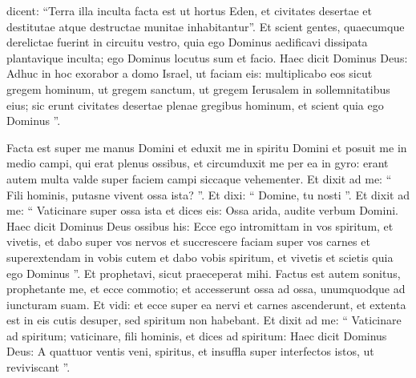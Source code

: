 \begin{biblechapter}
\begin{biblechapter}
\begin{biblechapter}
\begin{biblechapter}
\begin{biblechapter}
\begin{biblechapter}
\begin{biblechapter}
\begin{biblechapter}
\begin{biblechapter}
\begin{biblechapter}
\begin{biblechapter}
\begin{biblechapter}
\begin{biblechapter}
\begin{biblechapter}
\begin{biblechapter}
\begin{biblechapter}
\begin{biblechapter}
\begin{biblechapter}
\begin{biblechapter}
\begin{biblechapter}
\begin{biblechapter}
\begin{biblechapter}
\begin{biblechapter}
\begin{biblechapter}
\begin{biblechapter}
\begin{biblechapter}
\begin{biblechapter}
\begin{biblechapter}
\begin{biblechapter}
\begin{biblechapter}
\begin{biblechapter}
\begin{biblechapter}
\begin{biblechapter}
\begin{biblechapter}
\begin{biblechapter}
\begin{biblechapter}
 \verse dicent: “Terra illa inculta facta est ut hortus Eden, et civitates desertae et destitutae atque destructae munitae inhabitantur”. 
\verse Et scient gentes, quaecumque derelictae fuerint in circuitu vestro, quia ego Dominus aedificavi dissipata plantavique inculta; ego Dominus locutus sum et facio.
 \verse Haec dicit Dominus Deus: Adhuc in hoc exorabor a domo Israel, ut faciam eis: multiplicabo eos sicut gregem hominum, 
\verse ut gregem sanctum, ut gregem Ierusalem in sollemnitatibus eius; sic erunt civitates desertae plenae gregibus hominum, et scient quia ego Dominus ”.
 
\begin{biblechapter}
\verse Facta est super me manus Domini et eduxit me in spiritu Domini et posuit me in medio campi, qui erat plenus ossibus, 
\verse et circumduxit me per ea in gyro: erant autem multa valde super faciem campi siccaque vehementer. 
\verse Et dixit ad me: “ Fili hominis, putasne vivent ossa ista? ”. Et dixi: “ Domine, tu nosti ”. 
\verse Et dixit ad me: “ Vaticinare super ossa ista et dices eis: Ossa arida, audite verbum Domini. 
\verse Haec dicit Dominus Deus ossibus his: Ecce ego intromittam in vos spiritum, et vivetis, 
\verse et dabo super vos nervos et succrescere faciam super vos carnes et superextendam in vobis cutem et dabo vobis spiritum, et vivetis et scietis quia ego Dominus ”. 
\verse Et prophetavi, sicut praeceperat mihi. Factus est autem sonitus, prophetante me, et ecce commotio; et accesserunt ossa ad ossa, unumquodque ad iuncturam suam. 
\verse Et vidi: et ecce super ea nervi et carnes ascenderunt, et extenta est in eis cutis desuper, sed spiritum non habebant. 
\verse Et dixit ad me: “ Vaticinare ad spiritum; vaticinare, fili hominis, et dices ad spiritum: Haec dicit Dominus Deus: A quattuor ventis veni, spiritus, et insuffla super interfectos istos, ut reviviscant ”. 

\end{biblechapter}
\end{biblechapter}
\end{biblechapter}
\end{biblechapter}
\end{biblechapter}
\end{biblechapter}
\end{biblechapter}
\end{biblechapter}
\end{biblechapter}
\end{biblechapter}
\end{biblechapter}
\end{biblechapter}
\end{biblechapter}
\end{biblechapter}
\end{biblechapter}
\end{biblechapter}
\end{biblechapter}
\end{biblechapter}
\end{biblechapter}
\end{biblechapter}
\end{biblechapter}
\end{biblechapter}
\end{biblechapter}
\end{biblechapter}
\end{biblechapter}
\end{biblechapter}
\end{biblechapter}
\end{biblechapter}
\end{biblechapter}
\end{biblechapter}
\end{biblechapter}
\end{biblechapter}
\end{biblechapter}
\end{biblechapter}
\end{biblechapter}
\end{biblechapter}
\end{biblechapter}
